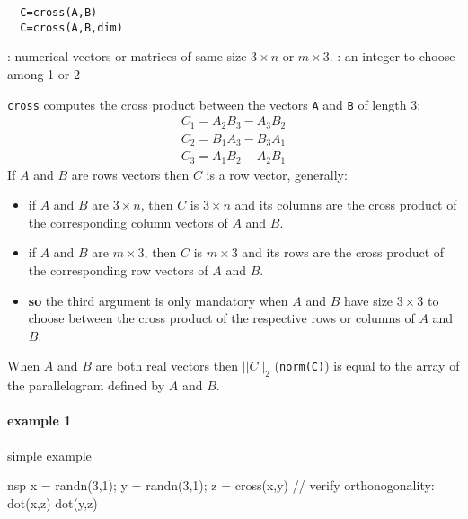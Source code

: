 \begin{mandesc}
\end{mandesc}
\begin{calling_sequence}
\begin{verbatim}
  C=cross(A,B)  
  C=cross(A,B,dim)  
\end{verbatim}
\end{calling_sequence}
\begin{parameters}
  \begin{varlist}
    : numerical vectors or matrices of same size $3 \times n$ or $m \times 3$. 
    : an integer to choose among 1 or 2
  \end{varlist}
\end{parameters}
\begin{mandescription}
  \verb+cross+ computes the cross product between the vectors \verb+A+ and \verb+B+ of length 3:
$$
\begin{array}{l}
     C_1 = A_2 B_3 - A_3 B_2 \\
     C_2 = B_1 A_3 - B_3 A_1 \\
     C_3 = A_1 B_2 - A_2 B_1
\end{array}
$$
 If  $A$ and $B$ are rows vectors then $C$ is a row vector, generally:
 \begin{itemize}
 \item if $A$ and $B$ are $3 \times n$, then $C$ is $3 \times n$ and its columns are the 
 cross product  of the corresponding column vectors of  $A$ and $B$.
 \item if $A$ and $B$ are $m \times 3$, then $C$ is $m \times 3$ and its rows are the 
 cross product  of the corresponding row vectors of  $A$ and $B$.
 \item {\bf so} the third argument is only mandatory when  $A$ and $B$ have size $3 \times 3$
 to choose between the cross product of the respective rows or columns of $A$ and $B$.
\end{itemize}
When $A$ and $B$ are both real vectors then $|| C ||_2$ (\verb+norm(C)+) is equal to the 
array of the parallelogram defined by $A$ and $B$.   
\end{mandescription}

\begin{examples}
\paragraph{example 1} simple example
\begin{mintednsp}{nsp}
  x = randn(3,1);
  y = randn(3,1);
  z = cross(x,y)
  // verify orthonogonality:
  dot(x,z)
  dot(y,z)
\end{mintednsp}
\end{examples}

\begin{manseealso}
\end{manseealso}

